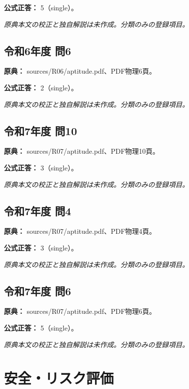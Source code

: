 \textbf{公式正答：} 5（single）。

\par\textit{原典本文の校正と独自解説は未作成。分類のみの登録項目。}

\subsection{令和6年度 問6}
\label{q:r06-reg-apt-06}

\noindent\textbf{原典：} sources/R06/aptitude.pdf、PDF物理6頁。

\textbf{公式正答：} 2（single）。

\par\textit{原典本文の校正と独自解説は未作成。分類のみの登録項目。}

\subsection{令和7年度 問10}
\label{q:r07-reg-apt-10}

\noindent\textbf{原典：} sources/R07/aptitude.pdf、PDF物理10頁。

\textbf{公式正答：} 3（single）。

\par\textit{原典本文の校正と独自解説は未作成。分類のみの登録項目。}

\subsection{令和7年度 問4}
\label{q:r07-reg-apt-04}

\noindent\textbf{原典：} sources/R07/aptitude.pdf、PDF物理4頁。

\textbf{公式正答：} 3（single）。

\par\textit{原典本文の校正と独自解説は未作成。分類のみの登録項目。}

\subsection{令和7年度 問6}
\label{q:r07-reg-apt-06}

\noindent\textbf{原典：} sources/R07/aptitude.pdf、PDF物理6頁。

\textbf{公式正答：} 5（single）。

\par\textit{原典本文の校正と独自解説は未作成。分類のみの登録項目。}

\section{安全・リスク評価}

